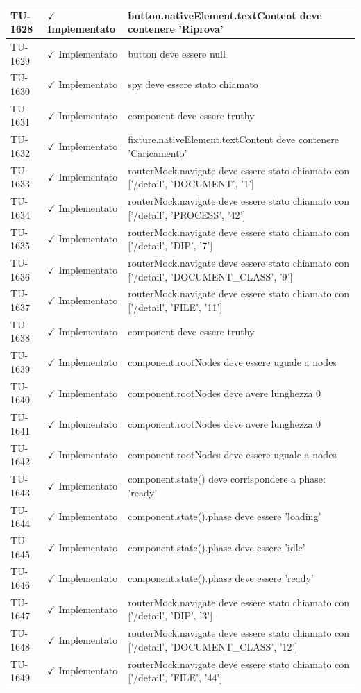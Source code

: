 ﻿\documentclass[a4paper,12pt]{article}
\newcommand{\ok}{\textcolor{green!60!black}{$\checkmark$ Implementato}}
\begin{document}
\begin{longtable}{|p{2cm}|p{3.5cm}|p{9.5cm}|}
\hline
TU-1628 & \ok & button.nativeElement.textContent deve contenere 'Riprova' \\
\hline
TU-1629 & \ok & button deve essere null \\
\hline
TU-1630 & \ok & spy deve essere stato chiamato \\
\hline
TU-1631 & \ok & component deve essere truthy \\
\hline
TU-1632 & \ok & fixture.nativeElement.textContent deve contenere 'Caricamento' \\
\hline
TU-1633 & \ok & routerMock.navigate deve essere stato chiamato con ['/detail', 'DOCUMENT', '1'] \\
\hline
TU-1634 & \ok & routerMock.navigate deve essere stato chiamato con ['/detail', 'PROCESS', '42'] \\
\hline
TU-1635 & \ok & routerMock.navigate deve essere stato chiamato con ['/detail', 'DIP', '7'] \\
\hline
TU-1636 & \ok & routerMock.navigate deve essere stato chiamato con ['/detail', 'DOCUMENT\_CLASS', '9'] \\
\hline
TU-1637 & \ok & routerMock.navigate deve essere stato chiamato con ['/detail', 'FILE', '11'] \\
\hline
TU-1638 & \ok & component deve essere truthy \\
\hline
TU-1639 & \ok & component.rootNodes deve essere uguale a nodes \\
\hline
TU-1640 & \ok & component.rootNodes deve avere lunghezza 0 \\
\hline
TU-1641 & \ok & component.rootNodes deve avere lunghezza 0 \\
\hline
TU-1642 & \ok & component.rootNodes deve essere uguale a nodes \\
\hline
TU-1643 & \ok & component.state() deve corrispondere a { phase: 'ready' } \\
\hline
TU-1644 & \ok & component.state().phase deve essere 'loading' \\
\hline
TU-1645 & \ok & component.state().phase deve essere 'idle' \\
\hline
TU-1646 & \ok & component.state().phase deve essere 'ready' \\
\hline
TU-1647 & \ok & routerMock.navigate deve essere stato chiamato con ['/detail', 'DIP', '3'] \\
\hline
TU-1648 & \ok & routerMock.navigate deve essere stato chiamato con ['/detail', 'DOCUMENT\_CLASS', '12'] \\
\hline
TU-1649 & \ok & routerMock.navigate deve essere stato chiamato con ['/detail', 'FILE', '44'] \\

\end{longtable}
\end{document}

